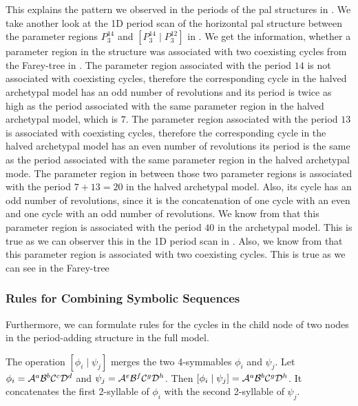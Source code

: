 This explains the pattern we observed in the periods of the \gls{pal} structures in .
We take another look at the 1D period scan of the horizontal \gls{pal} structure between the parameter regions $P^{14}_3$ and $\left[P^{14}_3  \mid P^{12}_3\right]$ in .
We get the information, whether a parameter region in the structure was associated with two coexisting cycles from the Farey-tree in .
The parameter region associated with the period $14$ is not associated with coexisting cycles, therefore the corresponding cycle in the halved archetypal model has an odd number of revolutions and its period is twice as high as the period associated with the same parameter region in the halved archetypal model, which is $7$.
The parameter region associated with the period $13$ is associated with coexisting cycles, therefore the corresponding cycle in the halved archetypal model has an even number of revolutions its period is the same as the period associated with the same parameter region in the halved archetypal mode.
The parameter region in between those two parameter regions is associated with the period $7 + 13 = 20$ in the halved archetypal model.
Also, its cycle has an odd number of revolutions, since it is the concatenation of one cycle with an even and one cycle with an odd number of revolutions.
We know from  that this parameter region is associated with the period $40$ in the archetypal model.
This is true as we can observer this in the 1D period scan in .
Also, we know from  that this parameter region is associated with two coexisting cycles.
This is true as we can see in the Farey-tree 


\subsubsection{Rules for Combining Symbolic Sequences}

Furthermore, we can formulate rules for the cycles in the child node of two nodes in the period-adding structure in the full model.

\begin{definition}
	The operation $\left[\phi_i \mid \psi_j\right]$ merges the two 4-symmables $\phi_i$ and $\psi_j$.
	Let $\phi_i = \mathcal{A}^a\mathcal{B}^b\mathcal{C}^c\mathcal{D}^d$ and $\psi_j = \mathcal{A}^e\mathcal{B}^f\mathcal{C}^g\mathcal{D}^h$.
	Then $\left[\phi_i \mid \psi_j\right] = \mathcal{A}^a\mathcal{B}^b\mathcal{C}^g\mathcal{D}^h$.
	It concatenates the first 2-syllable of $\phi_i$ with the second 2-syllable of $\psi_j$.
\end{definition}

